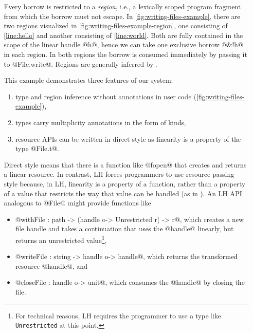 Every borrow is restricted to a \emph{region}, i.e., a lexically
scoped program fragment from which the borrow must not escape. In
\cref{fig:writing-files-example}, there are two regions visualized in \cref{fig:writing-files-example-region}, one
consisting of \cref{line:hello} and another consisting of
\cref{line:world}. Both are fully contained in the scope of the linear
handle @h@, hence we can take one exclusive borrow @&!h@ in each
region. In both regions the borrow is consumed immediately by passing
it to @File.write@. Regions are generally inferred by \lang.

This example demonstrates three features of our system:
\begin{enumerate}
\item type and region inference without annotations in user code (\cref{fig:writing-files-example}),
\item types carry multiplicity annotations in the form of kinds,
\item resource APIs can be written in direct style as linearity is a
  property of the type @File.t@.
\end{enumerate}

Direct style means that there is a function like @fopen@ that creates
and returns a linear resource. In contrast, LH forces programmers to
use resource-passing style because, in LH, linearity is a property of
a function, rather than a property of a value that restricts the way
that value can be handled (as in \lang). An LH API analogous to @File@
might provide functions like
\begin{itemize}
\item @withFile : path -> (handle o-> Unrestricted r) -> r@, which creates a new
  file handle and takes a continuation that uses the @handle@
  linearly, but returns an unrestricted value\footnote{For technical
    reasons, LH  requires the programmer to use a type like
    \lstinline/Unrestricted/ at this  point.},
\item @writeFile : string -> handle o-> handle@, which
  returns the transformed resource @handle@, and
\item @closeFile : handle o-> unit@, which consumes the @handle@ by
  closing the file.
\end{itemize}

